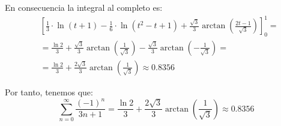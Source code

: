 \documentclass[12pt]{article}
\begin{document}
\begin{ejercicio}[2 puntos]
\begin{enumerate}[label=\alph*)]
\begin{itemize}
				En consecuencia la integral al completo es:
				\begin{align*}
					&\left[\frac{1}{3}\cdot \ln(t+1)-\frac{1}{6}\cdot\ln(t^2-t+1)+\frac{\sqrt{3}}{3}\arctan\left(\frac{2t-1}{\sqrt{3}}\right)\right]^1_0
					=\\&= \frac{\ln 2}{3} + \frac{\sqrt{3}}{3}\arctan\left(\frac{1}{\sqrt{3}}\right) - \frac{\sqrt{3}}{3}\arctan\left(-\frac{1}{\sqrt{3}}\right)
					=\\&= \frac{\ln 2}{3} + \frac{2\sqrt{3}}{3}\arctan\left(\frac{1}{\sqrt{3}}\right)\approx 0.8356
				\end{align*}

				Por tanto, tenemos que:
				\begin{equation*}
					\sum_{n=0}^{\infty} \frac{(-1)^n}{3n + 1}= \frac{\ln 2}{3} + \frac{2\sqrt{3}}{3}\arctan\left(\frac{1}{\sqrt{3}}\right)\approx 0.8356
				\end{equation*}
				\end{itemize}
		\end{enumerate}
	\end{ejercicio}
	
\end{document}
